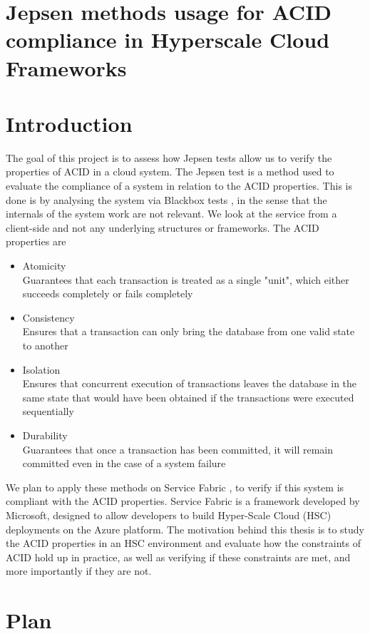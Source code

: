 \documentclass[a4paper,10pt,titlepage]{report}
\date{}
\begin{document}
\section{Jepsen methods usage for ACID compliance in Hyperscale Cloud Frameworks}

\section{Introduction}
The goal of this project is to assess how Jepsen \cite{jepsenaphyr} tests allow us to verify the properties of ACID \cite{dbms} in a cloud system. 
The Jepsen test is a method used to evaluate the compliance of a system in relation to the ACID properties. This is done is by analysing the system via Blackbox \cite{jepsenyoutubevideo} tests , in the sense that the internals of the system work are not relevant. We look at the service from a client-side and not any underlying structures or frameworks.  
The ACID properties are 
\begin{itemize}
\item	Atomicity \\
Guarantees that each transaction is treated as a single "unit", which either succeeds completely or fails completely 
\item	Consistency \\
Ensures that a transaction can only bring the database from one valid state to another
\item	Isolation \\
Ensures that concurrent execution of transactions leaves the database in the same state that would have been obtained if the transactions were executed sequentially 
\item	Durability \\
Guarantees that once a transaction has been committed, it will remain committed even in the case of a system failure \cite{dbms}
\end{itemize}

We plan to apply these methods on Service Fabric \cite{servicefabricoverview} , to verify if this system is compliant with the ACID properties. Service Fabric is a framework developed by Microsoft, designed to allow developers to build Hyper-Scale Cloud (HSC) deployments on the Azure \cite{azure} platform.    
The motivation behind this thesis is to study the ACID properties in an HSC environment and evaluate how the constraints of ACID hold up in practice, as well as verifying if these constraints are met, and more importantly if they are not. 
\section{Plan}
     
\end{document}
